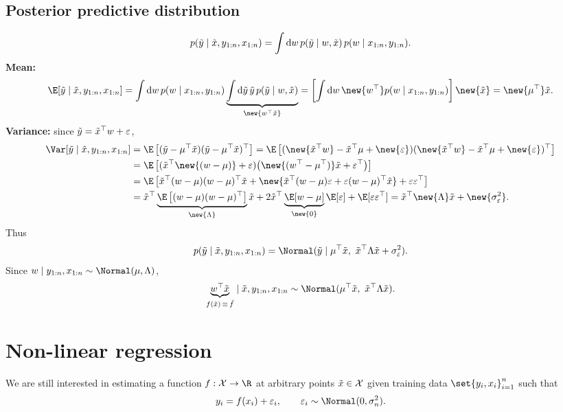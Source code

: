 \subsection{Posterior predictive distribution}
\[
p(\tilde y \mid \tilde x, y_{1:n}, x_{1:n}) = \int \mathrm{d}w\,p(\tilde y \mid w, \tilde x)\,p(w \mid x_{1:n}, y_{1:n}).
\]
\textbf{Mean:}
\[
\E[\yt \mid \xt, y_{1:n}, x_{1:n}] = \int \mathrm{d}w\,p(w \mid x_{1:n}, y_{1:n})\underbrace{\int \mathrm{d}\yt\,\yt\,p(\yt \mid w, \xt)}_{\new{w^{\top}\xt}}
= \left[\int \mathrm{d}w\,\new{w^{\top}}p(w \mid x_{1:n}, y_{1:n})\right]\new{\xt}
= \new{\mu^{\top}}\xt.
\]
\textbf{Variance:} since $\tilde y = \tilde x^{\top}w + \varepsilon$,
\begin{align*}
\Var[\yt \mid \xt, y_{1:n}, x_{1:n}] &= \E\left[(\yt - \mu^{\top}\xt)(\yt - \mu^{\top}\xt)^{\top}\right]
= \E\left[(\new{\xt^{\top}w} - \xt^{\top}\mu + \new{\varepsilon})(\new{\xt^{\top}w} - \xt^{\top}\mu + \new{\varepsilon})^{\top}\right]\\
&= \E\left[(\xt^{\top}\new{(w - \mu)} + \varepsilon)\big(\new{(w^{\top} - \mu^{\top})}\xt + \varepsilon^{\top}\big)\right]\\
&= \E\left[\xt^{\top}(w - \mu)(w - \mu)^{\top}\xt + \new{\xt^{\top}(w - \mu)\varepsilon + \varepsilon(w - \mu)^{\top}\xt} + \varepsilon\varepsilon^{\top}\right]\\
&= \xt^{\top}\underbrace{\E\left[(w - \mu)(w - \mu)^{\top}\right]}_{\new{\Lambda}}\xt + 2\xt^{\top}\underbrace{\E[w - \mu]}_{\new{0}}\E[\varepsilon] + \E[\varepsilon\varepsilon^{\top}]
= \xt^{\top}\new{\Lambda}\xt + \new{\sigma_\varepsilon^2}.
\end{align*}
Thus
\[
p(\yt \mid \xt, y_{1:n}, x_{1:n}) = \Normal(\yt \mid \mu^{\top}\xt,\ \xt^{\top}\Lambda\xt + \sigma_\varepsilon^2).
\]
Since $w \mid y_{1:n}, x_{1:n} \sim \Normal(\mu, \Lambda)$,
\[
\underbrace{w^{\top}\xt}_{f(\xt) \,\equiv\, \tilde f} \mid \xt, y_{1:n}, x_{1:n} \sim \Normal(\mu^{\top}\xt,\ \xt^{\top}\Lambda\xt).
\]

\section{Non-linear regression}
We are still interested in estimating a function $f : \mathcal{X} \to \R$ at arbitrary points $\tilde x \in \mathcal{X}$ given training data $\set{y_i, x_i}_{i=1}^{n}$ such that
\[
y_i = f(x_i) + \varepsilon_i, \qquad \varepsilon_i \sim \Normal(0, \sigma_n^2).
\]

